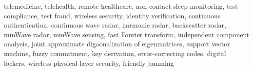 telemedicine,
telehealth,
remote healthcare,
non-contact sleep monitoring,
test compliance,
test fraud,
wireless security,
identity verification,
continuous authentication,
continuous wave radar,
harmonic radar,
backscatter radar,
mmWave radar,
mmWave sensing,
fast Fourier transform,
independent component analysis, 
joint approximate digaonalization of eigenmatrices,
support vector machine,
fuzzy commitment,
key derivation,
error-correcting codes,
digital lockers,
wireless physical layer security,
friendly jamming